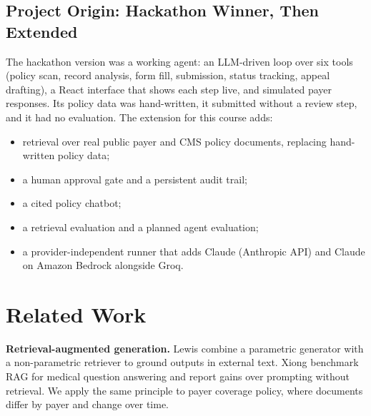 \documentclass[final]{cvpr}
\begin{document}
\subsection{Project Origin: Hackathon Winner, Then Extended}
\noindent{}

\smallskip
\noindent The hackathon version was a working agent: an LLM-driven loop over six tools (policy scan, record analysis, form fill, submission, status tracking, appeal drafting), a React interface that shows each step live, and simulated payer responses. Its policy data was hand-written, it submitted without a review step, and it had no evaluation. The extension for this course adds:
\begin{itemize}\itemsep0pt
\item retrieval over real public payer and CMS policy documents, replacing hand-written policy data;
\item a human approval gate and a persistent audit trail;
\item a cited policy chatbot;
\item a retrieval evaluation and a planned agent evaluation;
\item a provider-independent runner that adds Claude (Anthropic API) and Claude on Amazon Bedrock alongside Groq.
\end{itemize}

\section{Related Work}
\textbf{Retrieval-augmented generation.} Lewis \etal\cite{lewis2020rag} combine a parametric generator with a non-parametric retriever to ground outputs in external text. Xiong \etal\cite{xiong2024medrag} benchmark RAG for medical question answering and report gains over prompting without retrieval. We apply the same principle to payer coverage policy, where documents differ by payer and change over time.
\end{document}
